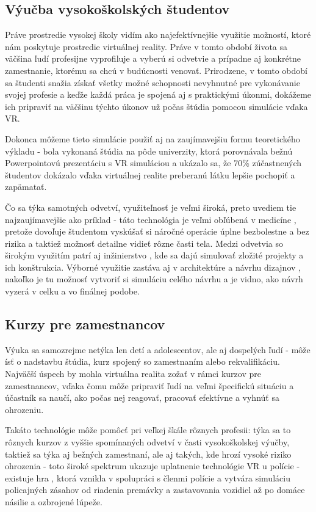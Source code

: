 \documentclass[10pt,twoside,slovak,a4paper]{article}
\begin{document}
\subsection{Výučba vysokoškolských študentov} \label{studenti}
Práve prostredie vysokej školy vidím ako najefektívnejšie využitie možností, ktoré nám poskytuje prostredie virtuálnej reality. Práve v tomto období života sa väčšina ľudí profesijne vyprofiluje a vyberú si odvetvie a prípadne aj konkrétne zamestnanie, ktorému sa chcú v budúcnosti venovať. Prirodzene, v tomto období sa študenti snažia získať všetky možné schopnosti nevyhnutné pre vykonávanie svojej profesie a keďže každá práca je spojená aj s praktickými úkonmi, dokážeme ich pripraviť na väčšinu týchto úkonov už počas štúdia pomocou simulácie vďaka VR. 

Dokonca môžeme tieto simulácie použiť aj na zaujímavejšiu formu teoretického výkladu - bola vykonaná štúdia na pôde univerzity, \cite{studium} ktorá porovnávala bežnú Powerpointovú prezentáciu s VR simuláciou a ukázalo sa, že 70\%  zúčastnených študentov dokázalo vďaka virtuálnej realite preberanú látku lepšie pochopiť  a zapämatať.

Čo sa týka samotných odvetví, využiteľnosť je veľmi široká, preto uvediem tie najzaujímavejšie ako príklad - táto technológia je veľmi obľúbená v medicíne \cite{lekarstvo}, pretože dovoľuje študentom vyskúšať si náročné operácie úplne bezbolestne a bez rizika a taktiež možnosť detailne vidieť rôzne časti tela. Medzi odvetvia so širokým využitím patrí aj inžinierstvo \cite{inzinierstvo}, kde sa dajú simulovať zložité projekty a ich konštrukcia. Výborné využitie zastáva aj v architektúre a návrhu dizajnov \cite{design}, nakoľko je tu možnosť vytvoriť si simuláciu celého návrhu a je vidno, ako návrh vyzerá v celku a vo finálnej podobe.

\subsection{Kurzy pre zamestnancov} \label{zamestnanci}
Výuka sa samozrejme netýka len detí a adolescentov, ale aj dospelých ľudí - môže ísť o nadstavbu štúdia, kurz spojený so zamestnaním alebo rekvalifikáciu. Najväčší úspech by mohla virtuálna realita zožať v rámci kurzov pre zamestnancov, vďaka čomu môže pripraviť ľudí na veľmi špecifickú situáciu a účastník sa naučí, ako počas nej reagovať, pracovať efektívne a vyhnúť sa ohrozeniu. 

Takáto technológie môže pomôcť pri veľkej škále rôznych profesii: týka sa to rôznych kurzov z vyššie spomínaných odvetví v časti vysokoškolskej výučby, taktiež sa týka aj bežných zamestnaní, ale aj takých, kde hrozí vysoké riziko ohrozenia - toto široké spektrum ukazuje uplatnenie technológie VR u polície - existuje hra \cite{policia}, ktorá vznikla v spolupráci s členmi polície a vytvára simuláciu policajných zásahov od riadenia premávky a zastavovania vozidiel až po domáce násilie a ozbrojené lúpeže.
\end{document}
